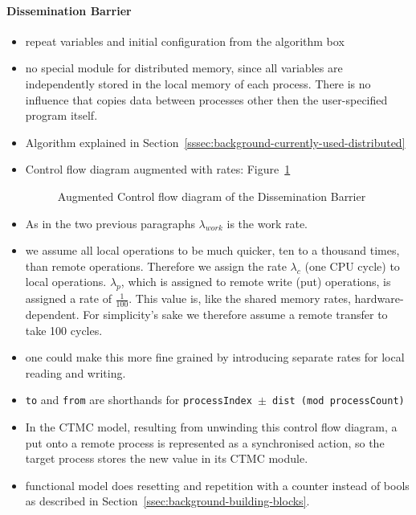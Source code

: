 \documentclass[a4paper, 10pt]{article}
\begin{document}
\paragraph{Dissemination Barrier}
\label{ssssec:analysis-modelchecking-modelling-dissemination}
\begin{itemize}
	\item repeat variables and initial configuration from the algorithm box
	\item no special module for distributed memory, since all variables are independently stored in the local memory of each process. There is no influence that copies data between processes other then the user-specified program itself.
	\item Algorithm explained in Section~\ref{sssec:background-currently-used-distributed}
	\item Control flow diagram augmented with rates: Figure~\ref{fig:model-dissemination}
		\begin{figure}[htbp]
			\centering
			
			\caption{Augmented Control flow diagram of the Dissemination Barrier}
			\label{fig:model-dissemination}
		\end{figure}
	\item As in the two previous paragraphs $\lambda_{work}$ is the work rate.
	\item we assume all local operations to be much quicker, ten to a thousand times, than remote operations. Therefore we assign the rate $\lambda_c$ (one CPU cycle) to local operations. $\lambda_p$, which is assigned to remote write (put) operations, is assigned a rate of $\frac{1}{100}$. This value is, like the shared memory rates, hardware-dependent. For simplicity's sake we therefore assume a remote transfer to take 100 cycles.
	\item one could make this more fine grained by introducing separate rates for local reading and writing.
	\item \texttt{to} and \texttt{from} are shorthands for \texttt{processIndex $\pm$ dist (mod processCount)}
	\item In the CTMC model, resulting from unwinding this control flow diagram, a put onto a remote process is represented as a synchronised action, so the target process stores the new value in its CTMC module.
	\item functional model does resetting and repetition with a counter instead of bools as described in Section~\ref{ssec:background-building-blocks}.
\end{itemize}
\end{document}
